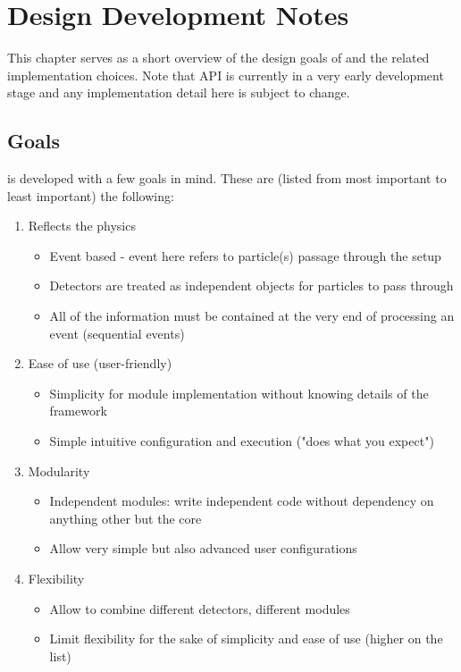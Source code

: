 \section{Design Development Notes}
This chapter serves as a short overview of the design goals of \apsq and the related implementation choices. Note that \apsq API is currently in a very early development stage and any implementation detail here is subject to change.

\subsection{Goals}
\apsq is developed with a few goals in mind. These are (listed from most important to least important) the following:
\begin{enumerate}
    \item Reflects the physics
    \begin{itemize}
        \item Event based - event here refers to particle(s) passage through the setup
        \item Detectors are treated as independent objects for particles to pass through
        \item All of the information must be contained at the very end of processing an event (sequential events)
    \end{itemize}
    \item Ease of use (user-friendly)
    \begin{itemize}
        \item Simplicity for module implementation without knowing details of the framework
        \item Simple intuitive configuration and execution ("does what you expect")
    \end{itemize}
    \item Modularity
    \begin{itemize}
        \item Independent modules: write independent code without dependency on anything other but the core
        \item Allow very simple but also advanced user configurations
    \end{itemize}
    \item Flexibility
    \begin{itemize}
        \item Allow to combine different detectors, different modules
        \item Limit flexibility for the sake of simplicity and ease of use (higher on the list)
    \end{itemize}
\end{enumerate}


